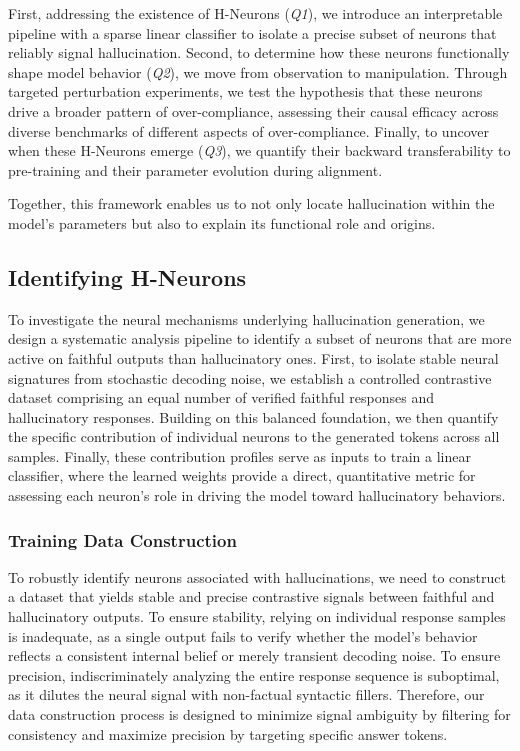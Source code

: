 \documentclass[dvipsnames]{article}
\begin{document}
First, addressing the existence of H-Neurons (\textit{Q1}), we introduce an interpretable pipeline with a sparse linear classifier to isolate a precise subset of neurons that reliably signal hallucination.
Second, to determine how these neurons functionally shape model behavior (\textit{Q2}), we move from observation to manipulation. Through targeted perturbation experiments, we test the hypothesis that these neurons drive a broader pattern of over-compliance, assessing their causal efficacy across diverse benchmarks of different aspects of over-compliance.
Finally, to uncover when these H-Neurons emerge (\textit{Q3}), we quantify their backward transferability to pre-training and their parameter evolution during alignment.

Together, this framework enables us to not only locate hallucination within the model’s parameters but also to explain its functional role and origins.

\subsection{Identifying H-Neurons}
\label{sec:identify_neurons}

To investigate the neural mechanisms underlying hallucination generation, we design a systematic analysis pipeline to identify a subset of neurons that are more active on faithful outputs than hallucinatory ones. First, to isolate stable neural signatures from stochastic decoding noise, we establish a controlled contrastive dataset comprising an equal number of verified faithful responses and hallucinatory responses. Building on this balanced foundation, we then quantify the specific contribution of individual neurons to the generated tokens across all samples. Finally, these contribution profiles serve as inputs to train a linear classifier, where the learned weights provide a direct, quantitative metric for assessing each neuron's role in driving the model toward hallucinatory behaviors.

\subsubsection{Training Data Construction}
To robustly identify neurons associated with hallucinations, we need to construct a dataset that yields stable and precise contrastive signals between faithful and hallucinatory outputs. To ensure stability, relying on individual response samples is inadequate, as a single output fails to verify whether the model's behavior reflects a consistent internal belief or merely transient decoding noise. To ensure precision, indiscriminately analyzing the entire response sequence is suboptimal, as it dilutes the neural signal with non-factual syntactic fillers. Therefore, our data construction process is designed to minimize signal ambiguity by filtering for consistency and maximize precision by targeting specific answer tokens.
\end{document}
